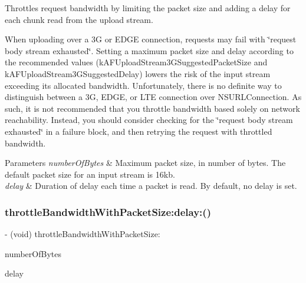Throttles request bandwidth by limiting the packet size and adding a delay for each chunk read from the upload stream.

When uploading over a 3G or E\+D\+GE connection, requests may fail with \char`\"{}request body stream exhausted\char`\"{}. Setting a maximum packet size and delay according to the recommended values ({\ttfamily k\+A\+F\+Upload\+Stream3\+G\+Suggested\+Packet\+Size} and {\ttfamily k\+A\+F\+Upload\+Stream3\+G\+Suggested\+Delay}) lowers the risk of the input stream exceeding its allocated bandwidth. Unfortunately, there is no definite way to distinguish between a 3G, E\+D\+GE, or L\+TE connection over {\ttfamily N\+S\+U\+R\+L\+Connection}. As such, it is not recommended that you throttle bandwidth based solely on network reachability. Instead, you should consider checking for the \char`\"{}request body stream exhausted\char`\"{} in a failure block, and then retrying the request with throttled bandwidth.


\begin{DoxyParams}{Parameters}
{\em number\+Of\+Bytes} & Maximum packet size, in number of bytes. The default packet size for an input stream is 16kb. \\
\hline
{\em delay} & Duration of delay each time a packet is read. By default, no delay is set. \\
\hline
\end{DoxyParams}
\mbox{\label{protocol_a_f_multipart_form_data-p_a6c60c3d0ab6d679fe548106efc147708}} 
\subsubsection{\texorpdfstring{throttle\+Bandwidth\+With\+Packet\+Size\+:delay\+:()}{throttleBandwidthWithPacketSize:delay:()}\hspace{0.1cm}{\footnotesize\ttfamily [2/3]}}
{\footnotesize\ttfamily -\/ (void) throttle\+Bandwidth\+With\+Packet\+Size\+: \begin{DoxyParamCaption}\item[{(N\+S\+U\+Integer)}]{number\+Of\+Bytes }\item[{delay:(N\+S\+Time\+Interval)}]{delay }\end{DoxyParamCaption}}

